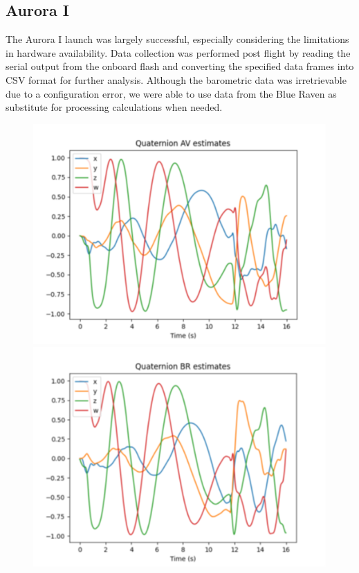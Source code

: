 \subsection{Aurora I}
The Aurora I launch was largely successful, especially considering the limitations in hardware availability. Data collection was performed post flight by reading the serial output from the onboard flash and converting the specified data frames into CSV format for further analysis. Although the barometric data was irretrievable due to a configuration error, we were able to use data from the Blue Raven as substitute for processing calculations when needed.  

\begin{figure}[h]
    \begin{center}
        \begin{minipage}{0.48\textwidth}
            \includegraphics[width=\linewidth]{./img/quaternion_AV-A1.png}
        \end{minipage}\hspace{1em}%
        \begin{minipage}{0.48\textwidth}
            \includegraphics[width=\linewidth]{./img/quaternion_BR-A1.png}

\end{minipage}
\end{center}
\end{figure}
